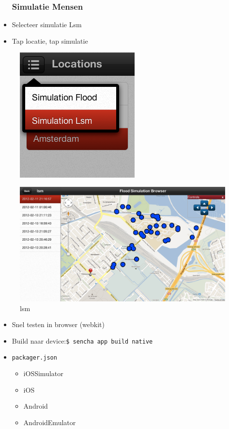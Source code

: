 \documentclass[10pt,a4paper]{beamer}
\begin{document}
\begin{frame}
\begin{itemize}
\frametitle{Simulatie Mensen}
\item Selecteer simulatie Lsm
\item Tap locatie, tap simulatie
\end{itemize}
\begin{figure}
\includegraphics[scale=0.2]{ui/select_lsm.png}
\end{figure}
\begin{figure}
	\includegraphics[scale=0.2]{ui/lsm.png}
	\caption{lsm}
\end{figure}
\end{frame}
\begin{frame}
\begin{itemize}
\frametitle{Deployment}
\item Snel testen in browser (webkit)
\item Build naar device:\texttt{\$ sencha app build native}
\item \texttt{packager.json}
\begin{itemize}
	\item iOSSimulator
	\item iOS
	\item Android
	\item AndroidEmulator
\end{itemize}
\end{itemize}
\end{frame}
\end{document}
